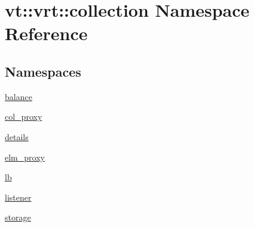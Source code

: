 \hypertarget{namespacevt_1_1vrt_1_1collection}{}\section{vt\+:\+:vrt\+:\+:collection Namespace Reference}
\label{namespacevt_1_1vrt_1_1collection}
\subsection*{Namespaces}
\begin{DoxyCompactItemize}
\item 
 \hyperlink{namespacevt_1_1vrt_1_1collection_1_1balance}{balance}
\item 
 \hyperlink{namespacevt_1_1vrt_1_1collection_1_1col__proxy}{col\+\_\+proxy}
\item 
 \hyperlink{namespacevt_1_1vrt_1_1collection_1_1details}{details}
\item 
 \hyperlink{namespacevt_1_1vrt_1_1collection_1_1elm__proxy}{elm\+\_\+proxy}
\item 
 \hyperlink{namespacevt_1_1vrt_1_1collection_1_1lb}{lb}
\item 
 \hyperlink{namespacevt_1_1vrt_1_1collection_1_1listener}{listener}
\item 
 \hyperlink{namespacevt_1_1vrt_1_1collection_1_1storage}{storage}
\end{DoxyCompactItemize}
